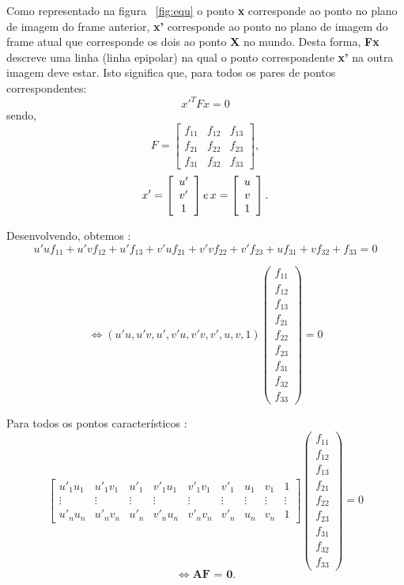Como representado na figura ~\ref{fig:equ} o ponto \textbf{x} corresponde ao ponto no plano de imagem do frame anterior, \textbf{x'} corresponde ao ponto no plano de imagem do frame atual que corresponde os dois ao ponto \textbf{X} no mundo. Desta forma, \textbf{Fx} descreve uma linha (linha epipolar) na qual o ponto correspondente \textbf{x'} na outra imagem deve estar. Isto significa que, para todos os pares de pontos correspondentes: \[ {x}'^{T} F x = 0 \] 
sendo, \[ F =  \left[ \begin{array}{ccc}
f_{11} & f_{12} & f_{13} \\ 
f_{21} & f_{22} & f_{23} \\ 
f_{31} & f_{32} & f_{33} 
\end{array}\right], \] \[ {x}' = \left[ \begin{array}{ccc}
{u}' \\ {v}'\\ 1 
\end{array} \right] e  \thinspace x = \left[ \begin{array}{ccc}
u \\ v \\ 1  \end{array}\right]  . \]

Desenvolvendo, obtemos : \[ u'uf_{11} + u'vf_{12} + u'f_{13} + v'uf_{21} + v'vf_{22} + v'f_{23} + uf_{31} + vf_{32} + f_{33} = 0 \]

\[	\Leftrightarrow (u'u , u'v , u' , v'u , v'v , v' , u , v , 1) \left( \begin{array}{ccccccccc}
f_{11}\\
f_{12}\\
f_{13}\\
f_{21}\\
f_{22}\\
f_{23}\\
f_{31}\\
f_{32}\\
f_{33}
\end{array} \right) = 0 \] 

Para todos os pontos característicos : \[  \left[ \begin{array}{ccccccccc }
u'_{1}u_{1} & u'_{1}v_{1} & u'_{1} & v'_{1}u_{1} & v'_{1}v_{1} & v'_{1} & u_{1} & v_{1} & 1 \\ 
\vdots  & \vdots  & \vdots  & \vdots  & \vdots  & \vdots  & \vdots  & \vdots  & \vdots \\ 
u'_nu_n & u'_nv_n & u'_n & v'_nu_n & v'_nv_n & v'_n & u_n & v_n & 1
\end{array}\right] \left( \begin{array}{ccccccccc}
f_{11}\\
f_{12}\\
f_{13}\\
f_{21}\\
f_{22}\\
f_{23}\\
f_{31}\\
f_{32}\\
f_{33}
\end{array} \right) = 0 \]  \begin{equation}\label{equ:af=0}
\Leftrightarrow \textbf{AF = 0}. 
\end{equation}

